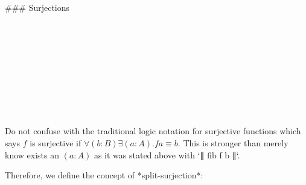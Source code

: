 ### Surjections

\begin{code}%
\>[0][@{}l@{\AgdaIndent{1}}]%
\>[2]\<%
\\
\>[2][@{}l@{\AgdaIndent{0}}]%
\>[4]\AgdaSymbol{:}\AgdaSpace{}%
\AgdaSymbol{\{}\AgdaSpace{}%
\AgdaSymbol{:}\AgdaSpace{}%
\AgdaSpace{}%
\AgdaSymbol{\}\{}\AgdaSpace{}%
\AgdaSymbol{:}\AgdaSpace{}%
\AgdaSpace{}%
\AgdaSymbol{\}}\<%
\\
%
\>[4]\AgdaSpace{}%
\AgdaSymbol{(}\AgdaSpace{}%
\AgdaSymbol{:}\AgdaSpace{}%
\AgdaSpace{}%
\AgdaSpace{}%
\AgdaSymbol{)}\<%
\\
%
\>[4]\AgdaSpace{}%
\AgdaSpace{}%
\AgdaSymbol{(}\AgdaSpace{}%
\AgdaSpace{}%
\AgdaSymbol{)}\<%
\\
%
\\[\AgdaEmptyExtraSkip]%
%
\>[2]\AgdaSpace{}%
\AgdaSymbol{\{}\AgdaSpace{}%
\AgdaSymbol{=}\AgdaSpace{}%
\AgdaSymbol{\}}\AgdaSpace{}%
\AgdaSpace{}%
\AgdaSymbol{=}\AgdaSpace{}%
\AgdaSymbol{(}\AgdaSpace{}%
\AgdaSymbol{:}\AgdaSpace{}%
\AgdaSymbol{)}\AgdaSpace{}%
\AgdaSpace{}%
\AgdaSpace{}%
\AgdaSpace{}%
\AgdaSpace{}%
\AgdaSpace{}%
\<%
\\
%
\\[\AgdaEmptyExtraSkip]%
%
\>[2]\AgdaSpace{}%
\AgdaSymbol{=}\AgdaSpace{}%
\<%
\\
%
\>[2]%
\>[15]\AgdaSymbol{=}\AgdaSpace{}%
\<%
\end{code}

Do not confuse with the traditional logic notation
for surjective functions which says $f$ is surjective if
$∀ (b : B) ∃ (a : A) . f a ≡ b$. This is stronger than merely
know exists an $(a : A)$ as it was stated above with `∥ fib f b ∥`.

Therefore, we define the concept of *split-surjection*:

